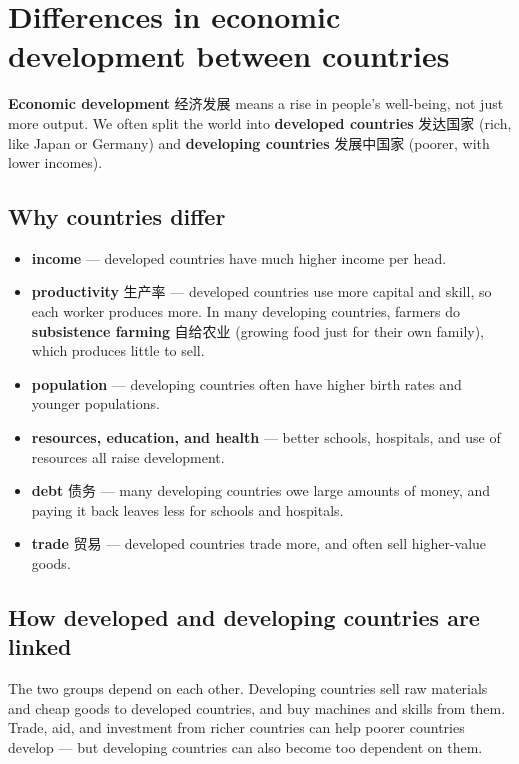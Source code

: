 \documentclass[11pt]{article}
\begin{document}
\section*{Differences in economic development between countries}

\textbf{Economic development} 经济发展 means a rise in people's well-being, not just more output. We often split the world into \textbf{developed countries} 发达国家 (rich, like Japan or Germany) and \textbf{developing countries} 发展中国家 (poorer, with lower incomes).

\subsection*{Why countries differ}

\begin{itemize}
\item \textbf{income} — developed countries have much higher income per head.

\item \textbf{productivity} 生产率 — developed countries use more capital and skill, so each worker produces more. In many developing countries, farmers do \textbf{subsistence farming} 自给农业 (growing food just for their own family), which produces little to sell.

\item \textbf{population} — developing countries often have higher birth rates and younger populations.

\item \textbf{resources, education, and health} — better schools, hospitals, and use of resources all raise development.

\item \textbf{debt} 债务 — many developing countries owe large amounts of money, and paying it back leaves less for schools and hospitals.

\item \textbf{trade} 贸易 — developed countries trade more, and often sell higher-value goods.

\end{itemize}

\subsection*{How developed and developing countries are linked}

The two groups depend on each other. Developing countries sell raw materials and cheap goods to developed countries, and buy machines and skills from them. Trade, aid, and investment from richer countries can help poorer countries develop — but developing countries can also become too dependent on them.
\end{document}
